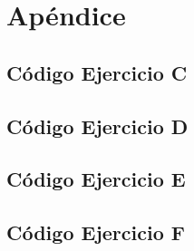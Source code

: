 \section{Apéndice}

\subsection{Código Ejercicio C}
\label{code:ex3}

\subsection{Código Ejercicio D}
\label{code:ex4}

\subsection{Código Ejercicio E}
\label{code:ex5}

\subsection{Código Ejercicio F}
\label{code:ex6}